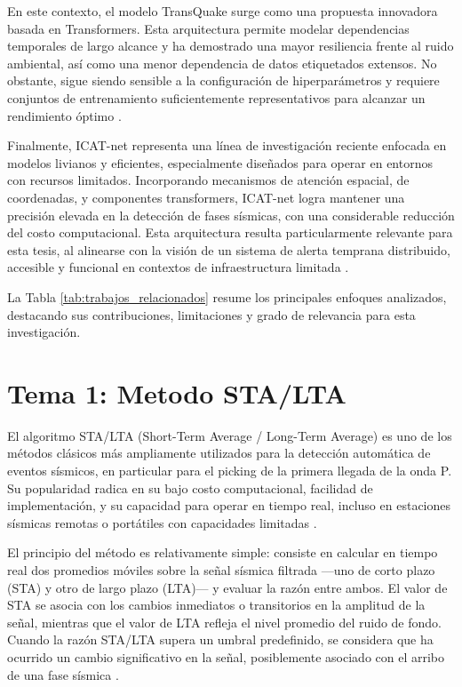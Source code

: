 En este contexto, el modelo TransQuake surge como una propuesta innovadora basada en Transformers. Esta arquitectura permite modelar dependencias temporales de largo alcance y ha demostrado una mayor resiliencia frente al ruido ambiental, así como una menor dependencia de datos etiquetados extensos. No obstante, sigue siendo sensible a la configuración de hiperparámetros y requiere conjuntos de entrenamiento suficientemente representativos para alcanzar un rendimiento óptimo \cite{zhang2023ept}.

Finalmente, ICAT-net representa una línea de investigación reciente enfocada en modelos livianos y eficientes, especialmente diseñados para operar en entornos con recursos limitados. Incorporando mecanismos de atención espacial, de coordenadas, y componentes transformers, ICAT-net logra mantener una precisión elevada en la detección de fases sísmicas, con una considerable reducción del costo computacional. Esta arquitectura resulta particularmente relevante para esta tesis, al alinearse con la visión de un sistema de alerta temprana distribuido, accesible y funcional en contextos de infraestructura limitada \cite{Bertino93}.

La Tabla \ref{tab:trabajos_relacionados} resume los principales enfoques analizados, destacando sus contribuciones, limitaciones y grado de relevancia para esta investigación.

\section{Tema 1: Metodo STA/LTA}

El algoritmo STA/LTA (Short-Term Average / Long-Term Average) es uno de los métodos clásicos más ampliamente utilizados para la detección automática de eventos sísmicos, en particular para el picking de la primera llegada de la onda P. Su popularidad radica en su bajo costo computacional, facilidad de implementación, y su capacidad para operar en tiempo real, incluso en estaciones sísmicas remotas o portátiles con capacidades limitadas \cite{allen1978automatic}.

El principio del método es relativamente simple: consiste en calcular en tiempo real dos promedios móviles sobre la señal sísmica filtrada —uno de corto plazo (STA) y otro de largo plazo (LTA)— y evaluar la razón entre ambos. El valor de STA se asocia con los cambios inmediatos o transitorios en la amplitud de la señal, mientras que el valor de LTA refleja el nivel promedio del ruido de fondo. Cuando la razón STA/LTA supera un umbral predefinido, se considera que ha ocurrido un cambio significativo en la señal, posiblemente asociado con el arribo de una fase sísmica \cite{allen1978automatic}.

